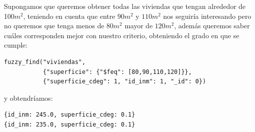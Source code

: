 \begin{example}
Supongamos que queremos obtener todas las viviendas que tengan alrededor de 100$m^2$, teniendo en cuenta que entre $90m^2$ y $110m^2$ nos seguiría interesando pero no queremos que tenga menos de $80m^2$  mayor de $120m^2$, además queremos saber cuáles corresponden mejor con nuestro criterio, obteniendo el grado en que se cumple:
%
\begin{verbatim}
fuzzy_find("viviendas", 
           {"superficie": {"$feq": [80,90,110,120]}}, 
           {"superficie_cdeg": 1, "id_inm": 1, "_id": 0})
\end{verbatim}
%
y obtendríamos:
%
\begin{lstlisting}[numbers=none]
{id_inm: 245.0, superficie_cdeg: 0.1}
{id_inm: 235.0, superficie_cdeg: 0.1}
\end{lstlisting}
%
\end{example}

